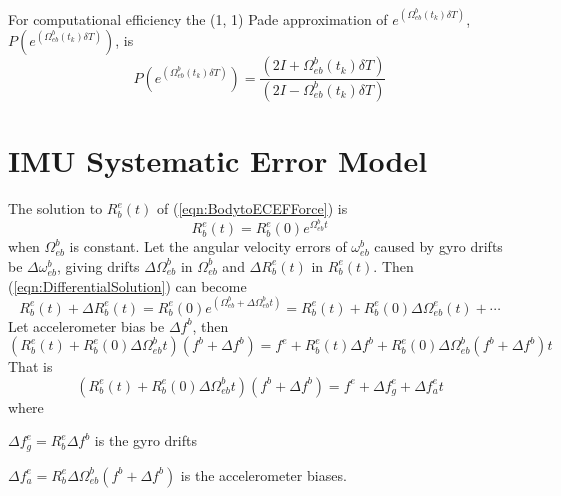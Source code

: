 \documentclass[a4paper]{report}
\numberwithin{equation}{chapter}
\begin{document}
For computational efficiency the (1, 1) Pade approximation of $e^{\left( \Omega^b_{eb} \left( t_k \right) \delta{T} \right)}$, $P \left(e^{\left( \Omega^b_{eb} \left( t_k \right) \delta{T} \right)} \right)$, is
\begin{equation}
P \left( e^{\left( \Omega^b_{eb} \left( t_k \right) \delta{T} \right)} \right) = \frac{\left( 2I + \Omega^b_{eb} \left( t_k \right) \delta{T} \right)}{\left( 2I - \Omega^b_{eb} \left( t_k \right) \delta{T} \right)}
\end{equation}

\section[IMU Systematic Error Model]{IMU Systematic Error Model}

The solution to $R^e_b \left( t \right)$ of (\ref{eqn:BodytoECEFForce}) is
\begin{equation}
R^e_b \left( t \right) = R^e_b \left( 0 \right) e^{\Omega^b_{eb} t}
\label{eqn:DifferentialSolution}
\end{equation}
when $\Omega^b_{eb}$ is constant. Let the angular velocity errors of $\omega^b_{eb}$ caused by gyro drifts be $\Delta \omega^b_{eb}$, giving drifts $\Delta \Omega^b_{eb}$ in $\Omega^b_{eb}$ and $\Delta R^e_b \left( t \right)$ in $R^e_b \left( t \right)$. Then (\ref{eqn:DifferentialSolution}) can become
\begin{equation}
R^e_b \left( t \right) + \Delta R^e_b \left( t \right) = R^e_b \left( 0 \right) e^{\left( \Omega^b_{eb} + \Delta \Omega^b_{eb} t \right)} = R^e_b \left( t \right) + R^e_b \left( 0 \right) \Delta \Omega^e_{eb} \left( t \right) + \dotsb
\end{equation}
Let accelerometer bias be $\Delta f^b$, then
\begin{equation}
\left( R^e_b \left( t \right) + R^e_b \left( 0 \right) \Delta \Omega^b_{eb} t \right) \left( f^b + \Delta f^b \right) = f^e + R^e_b \left( t \right) \Delta f^b + R^e_b \left( 0 \right) \Delta \Omega^b_{eb} \left( f^b + \Delta f^b \right) t
\end{equation}
That is
\begin{equation}
\left( R^e_b \left( t \right) + R^e_b \left( 0 \right) \Delta \Omega^b_{eb} t \right) \left( f^b + \Delta f^b \right) = f^e + \Delta f^e_g + \Delta f^e_a t
\end{equation}
where

$\Delta f^e_g = R^e_b \Delta f^b$ is the gyro drifts

$\Delta f^e_a = R^e_b \Delta \Omega^b_{eb} \left( f^b + \Delta f^b \right)$ is the accelerometer biases.
\end{document}
